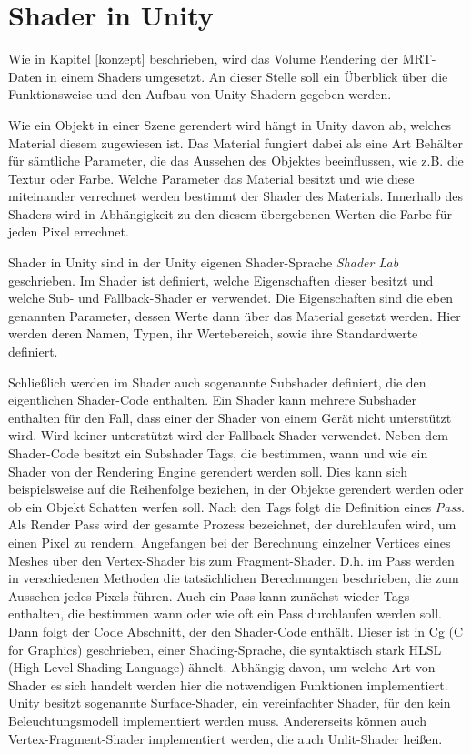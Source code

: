 

\section{Shader in Unity}

Wie in Kapitel \ref{konzept} beschrieben, wird das Volume Rendering der MRT-Daten in einem Shaders umgesetzt. An dieser Stelle soll ein Überblick über die Funktionsweise und den Aufbau von Unity-Shadern gegeben werden. 

Wie ein Objekt in einer Szene gerendert wird hängt in Unity davon ab, welches Material diesem zugewiesen ist. Das Material fungiert dabei als eine Art Behälter für sämtliche Parameter, die das Aussehen des Objektes beeinflussen, wie z.B. die Textur oder Farbe. Welche Parameter das Material besitzt und wie diese miteinander verrechnet werden bestimmt der Shader des Materials. Innerhalb des Shaders wird in Abhängigkeit zu den diesem übergebenen Werten die Farbe für jeden Pixel errechnet. 

Shader in Unity sind in der Unity eigenen Shader-Sprache \textit{Shader Lab} geschrieben. Im Shader ist definiert, welche Eigenschaften dieser besitzt und welche Sub- und Fallback-Shader er verwendet.
Die Eigenschaften sind die eben genannten Parameter, dessen Werte dann über das Material gesetzt werden. Hier werden deren Namen, Typen, ihr Wertebereich, sowie ihre Standardwerte definiert. 

Schließlich werden im Shader auch sogenannte Subshader definiert, die den eigentlichen Shader-Code enthalten.
Ein Shader kann mehrere Subshader enthalten für den Fall, dass einer der Shader von einem Gerät nicht unterstützt wird. Wird keiner unterstützt wird der Fallback-Shader verwendet. 
Neben dem Shader-Code besitzt ein Subshader Tags, die bestimmen, wann und wie ein Shader von der Rendering Engine gerendert werden soll. Dies kann sich beispielsweise auf die Reihenfolge beziehen, in der Objekte gerendert werden oder ob ein Objekt Schatten werfen soll. 
Nach den Tags folgt die Definition eines \textit{Pass}. Als Render Pass wird der gesamte Prozess bezeichnet, der durchlaufen wird, um einen Pixel zu rendern. Angefangen bei der Berechnung einzelner Vertices eines Meshes über den Vertex-Shader bis zum Fragment-Shader. D.h. im Pass werden in verschiedenen Methoden die tatsächlichen Berechnungen beschrieben, die zum Aussehen jedes Pixels führen. 
Auch ein Pass kann zunächst wieder Tags enthalten, die bestimmen wann oder wie oft ein Pass durchlaufen werden soll. 
Dann folgt der Code Abschnitt, der den Shader-Code enthält. Dieser ist in Cg (C for Graphics)
 geschrieben, einer Shading-Sprache, die syntaktisch stark HLSL (High-Level Shading Language) ähnelt. 
Abhängig davon, um welche Art von Shader es sich handelt werden hier die notwendigen Funktionen implementiert. Unity besitzt sogenannte Surface-Shader, ein vereinfachter Shader, für den kein Beleuchtungsmodell implementiert werden muss. Andererseits können auch Vertex-Fragment-Shader implementiert werden, die auch Unlit-Shader heißen. 

